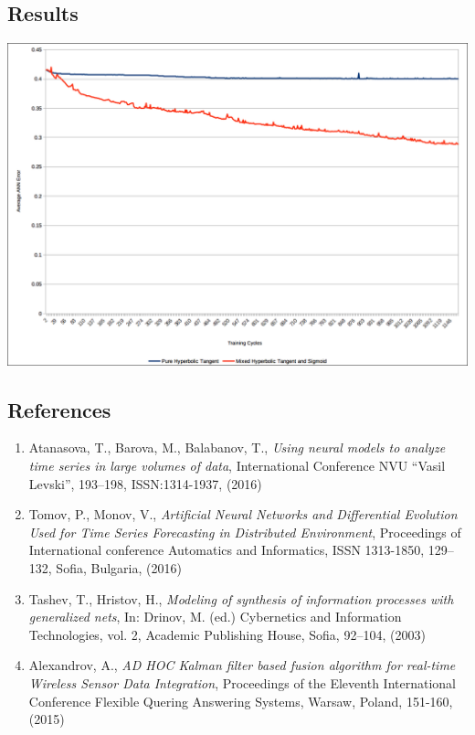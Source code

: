 \documentclass[a0,portrait,25pt]{sciposter}
\begin{document}
\begin{multicols}{3}
\begin{mdframed}[backgroundcolor=white,roundcorner=4pt,shadow=true,linewidth=1pt]
\color{Black}
\section*{Results}
\begin{minipage}[c]{1\linewidth}
\includegraphics[width=0.9\linewidth]{fig04}
\end{minipage}
\end{mdframed}

\begin{mdframed}[backgroundcolor=white,roundcorner=4pt,shadow=true,linewidth=1pt]
\color{Black}
\section*{References}
\begin{enumerate}
\item Atanasova, T., Barova, M., Balabanov, T., \textit{Using neural models to analyze time series in large volumes of data}, International Conference  NVU “Vasil Levski”, 193--198, ISSN:1314-1937, (2016) 
\item Tomov, P., Monov, V., \textit{Artificial Neural Networks and Differential Evolution Used for Time Series Forecasting in Distributed Environment}, Proceedings of International conference Automatics and Informatics, ISSN 1313-1850, 129--132, Sofia, Bulgaria, (2016) 
\item Tashev, T., Hristov, H., \textit{Modeling of synthesis of information processes with generalized nets}, In: Drinov, M. (ed.) Cybernetics and Information Technologies, vol. 2, Academic Publishing House, Sofia, 92–104, (2003) 
\item Alexandrov, A., \textit{AD HOC Kalman filter based fusion algorithm for real-time Wireless Sensor Data Integration}, Proceedings of the Eleventh International Conference Flexible Quering Answering Systems, Warsaw, Poland, 151-160, (2015)
\end{enumerate}
\end{mdframed}


\end{multicols}
\end{document}
